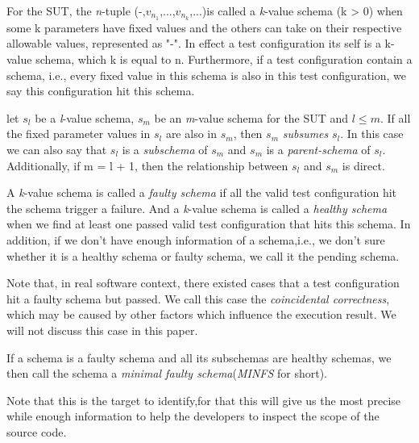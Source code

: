 \documentclass[10pt,journal,cspaper,compsoc]{IEEEtran}
\begin{document}
\begin{definition}[schema]
For the SUT, the \emph{n}-tuple (-,$v_{n_{1}}$,...,$v_{n_{k}}$,...)is called a \emph{k}-value schema (k > 0) when some k parameters have fixed values and the others can take on their respective allowable values, represented as "-". In effect a test configuration its self is a k-value schema, which k is equal to n. Furthermore, if a test configuration contain a schema, i.e., every fixed value in this schema is also in this test configuration, we say this configuration hit this schema.
\end{definition}
\begin{definition}
let $s_{l}$ be a \emph{l}-value schema, $s_{m}$ be an \emph{m}-value schema for the SUT and $l \leq m$. If all the fixed parameter values in $s_{l}$ are also in $s_{m}$, then $s_{m}$ \emph{subsumes} $s_{l}$. In this case we can also say that $s_{l}$ is a \emph{subschema} of $s_{m}$ and $s_{m}$ is a \emph{parent-schema} of $s_{l}$. Additionally, if m = l + 1, then the relationship between $s_{l}$ and $s_{m}$ is direct.
\end{definition}
\begin{definition}
A \emph{k}-value schema is called a \emph{faulty schema} if all the valid test configuration hit the schema trigger a failure. And a \emph{k}-value schema is called a \emph{healthy schema} when we find at least one passed valid test configuration that hits this schema. In addition, if we don't have enough information of a schema,i.e., we don't sure whether it is a healthy schema or faulty schema, we call it the pending schema.
\end{definition}

Note that, in real software context, there existed cases that a test configuration hit a faulty schema but passed. We call this case the \emph{coincidental correctness}, which may be caused by other factors which influence the execution result. We will not discuss this case in this paper.

\begin{definition}
If a schema is a faulty schema and all its subschemas are healthy schemas, we then call the schema a \emph{minimal faulty schema}(\emph{MINFS} for short).
\end{definition}

Note that this is the target to identify,for that this will give us the most precise while enough information to help the developers to inspect the scope of the source code.
\end{document}
